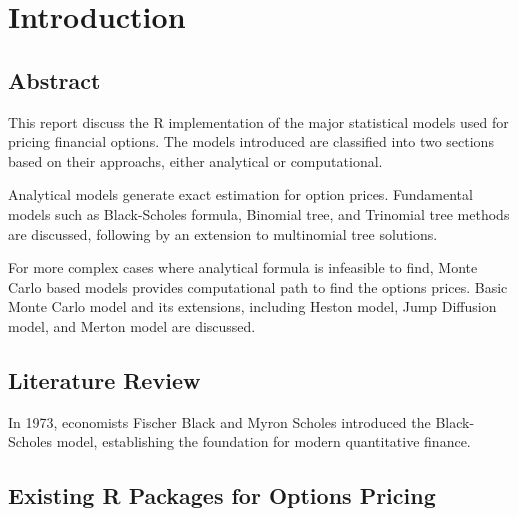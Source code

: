 \chapter{Introduction}

\section{Abstract}
This report discuss the R implementation of the major statistical models used for pricing financial options. The models introduced are classified into two sections based on their approachs, either analytical or computational.

Analytical models generate exact estimation for option prices. Fundamental models such as Black-Scholes formula, Binomial tree, and Trinomial tree methods are discussed, following by an extension to multinomial tree solutions.

For more complex cases where analytical formula is infeasible to find, Monte Carlo based models provides computational path to find the options prices. Basic Monte Carlo model and its extensions, including Heston model, Jump Diffusion model, and Merton model are discussed.

\section{Literature Review}
In 1973, economists Fischer Black and Myron Scholes introduced the Black-Scholes model, establishing the foundation for modern quantitative finance.




\section{Existing R Packages for Options Pricing}

\newpage